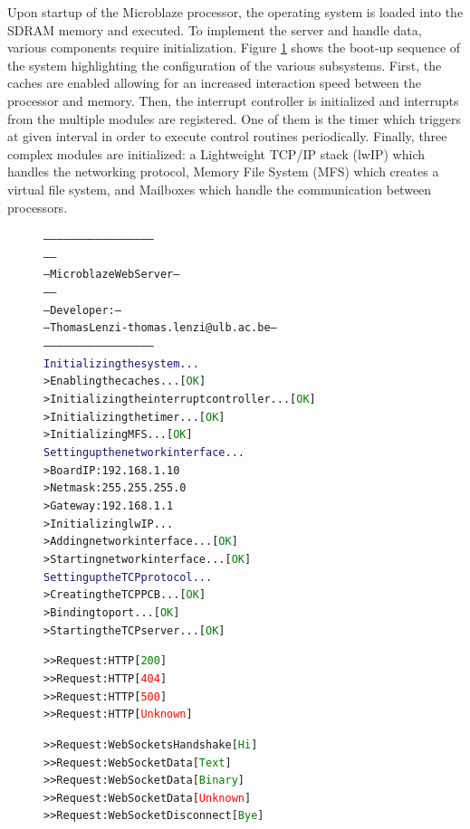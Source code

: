     Upon startup of the Microblaze processor, the operating system is loaded into the SDRAM memory and executed. To implement the server and handle data, various components require initialization. Figure \ref{fig:III-2-Microblaze} shows the boot-up sequence of the system highlighting the configuration of the various subsystems. First, the caches are enabled allowing for an increased interaction speed between the processor and memory. Then, the interrupt controller is initialized and interrupts from the multiple modules are registered. One of them is the timer which triggers at given interval in order to execute control routines periodically. Finally, three complex modules are initialized: a Lightweight TCP/IP stack (lwIP) which handles the networking protocol, Memory File System (MFS) which creates a virtual file system, and Mailboxes which handle the communication between processors.

    \begin{figure}[p!]
\begin{alltt}
--------------------------------------------------
--                                              --
--            Microblaze Web Server             --
--                                              --
--    Developer:                                --
--    Thomas Lenzi - thomas.lenzi@ulb.ac.be     --
--------------------------------------------------
\textcolor{MidnightBlue}{Initializing the system...}
> Enabling the caches...                     [\textcolor{Green}{OK}]
> Initializing the interrupt controller...   [\textcolor{Green}{OK}]
> Initializing the timer...                  [\textcolor{Green}{OK}]
> Initializing MFS...                        [\textcolor{Green}{OK}]
\textcolor{MidnightBlue}{Setting up the network interface...}
> Board IP: 192.168.1.10
> Netmask : 255.255.255.0
> Gateway : 192.168.1.1
> Initializing lwIP...
> Adding network interface...                [\textcolor{Green}{OK}]
> Starting network interface...              [\textcolor{Green}{OK}]
\textcolor{MidnightBlue}{Setting up the TCP protocol...}
> Creating the TCP PCB...                    [\textcolor{Green}{OK}]
> Binding to port...                         [\textcolor{Green}{OK}]
> Starting the TCP server...                 [\textcolor{Green}{OK}]

>> Request: HTTP                             [\textcolor{Green}{200}]
>> Request: HTTP                             [\textcolor{Red}{404}]
>> Request: HTTP                             [\textcolor{Red}{500}]
>> Request: HTTP                             [\textcolor{Red}{Unknown}]

>> Request: WebSockets Handshake             [\textcolor{Green}{Hi}]
>> Request: WebSocket Data                   [\textcolor{Green}{Text}]
>> Request: WebSocket Data                   [\textcolor{Green}{Binary}]
>> Request: WebSocket Data                   [\textcolor{Red}{Unknown}]
>> Request: WebSocket Disconnect             [\textcolor{Green}{Bye}]
\end{alltt}
      \caption{}
      \label{fig:III-2-Microblaze}
    \end{figure}

